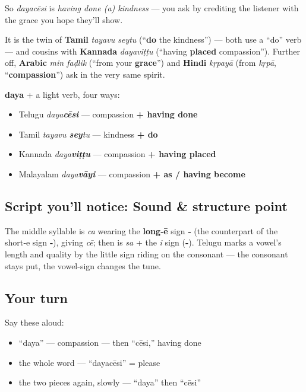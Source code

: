 So \emph{dayacēsi} is \emph{having done (a) kindness} — you ask by crediting the listener with the grace you hope they'll show.

It is the twin of \textbf{Tamil} \emph{tayavu seytu} (\textquotedblleft{}\textbf{do} the kindness\textquotedblright{}) — both use a \textquotedblleft{}do\textquotedblright{} verb — and cousins with \textbf{Kannada} \emph{dayaviṭṭu} (\textquotedblleft{}having \textbf{placed} compassion\textquotedblright{}). Further off, \textbf{Arabic} \emph{min faḍlik} (\textquotedblleft{}from your \textbf{grace}\textquotedblright{}) and \textbf{Hindi} \emph{kṛpayā} (from \emph{kṛpā}, \textquotedblleft{}\textbf{compassion}\textquotedblright{}) ask in the very same spirit.

\begin{cousinweb}
\textbf{daya} + a light verb, four ways:

\begin{itemize}
\raggedright
  \item Telugu \textbf{} \emph{daya\textbf{cēsi}} — compassion \textbf{+ having done}
  \item Tamil \textbf{} \emph{tayavu \textbf{sey}tu} — kindness \textbf{+ do}
  \item Kannada \textbf{} \emph{daya\textbf{viṭṭu}} — compassion \textbf{+ having placed}
  \item Malayalam \textbf{} \emph{daya\textbf{vāyi}} — compassion \textbf{+ as / having become}
\end{itemize}
\end{cousinweb}

\subsection*{Script you'll notice: Sound \& structure point}
The middle syllable \textbf{} is \emph{ca} wearing the \textbf{long‑ē} sign \textbf{‑} (the counterpart of the short‑e sign \textbf{‑}), giving \emph{cē}; then \textbf{} is \emph{sa} + the \emph{i} sign (\textbf{‑}). Telugu marks a vowel's length and quality by the little sign riding on the consonant — the consonant stays put, the vowel-sign changes the tune.

\subsection*{Your turn}
Say these aloud:

\begin{itemize}
\raggedright
  \item \textquotedblleft{}daya\textquotedblright{} — compassion — then \textquotedblleft{}cēsi,\textquotedblright{} having done
  \item the whole word — \textquotedblleft{}dayacēsi\textquotedblright{} = please
  \item the two pieces again, slowly — \textquotedblleft{}daya\textquotedblright{} then \textquotedblleft{}cēsi\textquotedblright{}
\end{itemize}

